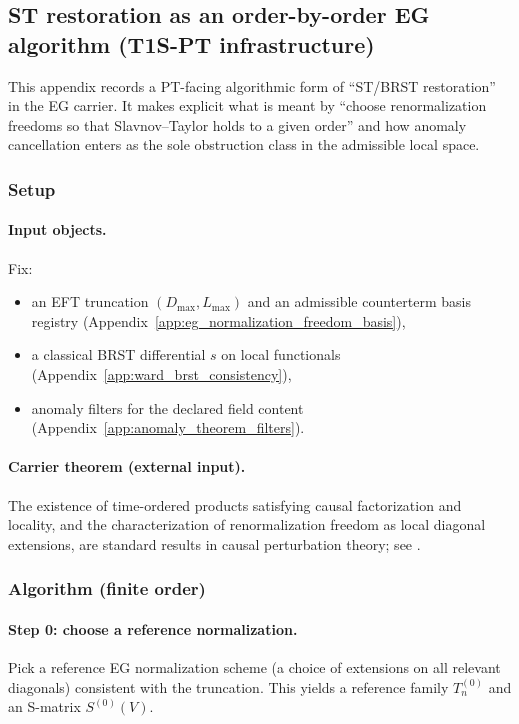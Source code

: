 \subsection{ST restoration as an order-by-order EG algorithm (T1S-PT infrastructure)}
\label{app:eg_st_restoration_algorithm}

\AuditTag This appendix records a PT-facing algorithmic form of ``ST/BRST restoration'' in the EG carrier.
It makes explicit what is meant by ``choose renormalization freedoms so that Slavnov--Taylor holds to a given order'' and how anomaly cancellation enters as the sole obstruction class in the admissible local space.

\subsubsection{Setup}
\paragraph{Input objects.}
Fix:
\begin{itemize}
\item an EFT truncation $(D_{\max},L_{\max})$ and an admissible counterterm basis registry (Appendix~\ref{app:eg_normalization_freedom_basis}),
\item a classical BRST differential $s$ on local functionals (Appendix~\ref{app:ward_brst_consistency}),
\item anomaly filters for the declared field content (Appendix~\ref{app:anomaly_theorem_filters}).
\end{itemize}

\paragraph{Carrier theorem (external input).}
\AuditTag The existence of time-ordered products satisfying causal factorization and locality, and the characterization of renormalization freedom as local diagonal extensions, are standard results in causal perturbation theory; see \cite{EpsteinGlaser1973,BrunettiFredenhagen2000Microlocal,Dutsch2019pAQFT}.

\subsubsection{Algorithm (finite order)}
\paragraph{Step 0: choose a reference normalization.}
Pick a reference EG normalization scheme (a choice of extensions on all relevant diagonals) consistent with the truncation.
This yields a reference family $T_n^{(0)}$ and an S-matrix $S^{(0)}(V)$.

